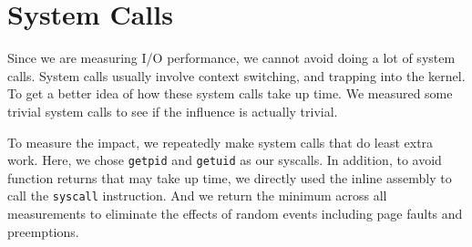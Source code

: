 \section{System Calls}

Since we are measuring I/O performance, we cannot avoid doing a lot of system calls. System calls usually involve context switching, and trapping into the kernel. To get a better idea of how these system calls take up time. We measured some trivial system calls to see if the influence is actually trivial.

To measure the impact, we repeatedly make system calls that do least extra work. Here, we chose \texttt{getpid} and \texttt{getuid} as our syscalls. In addition, to avoid function returns that may take up time, we directly used the inline assembly to call the \texttt{syscall} instruction. And we return the minimum across all measurements to eliminate the effects of random events including page faults and preemptions.
